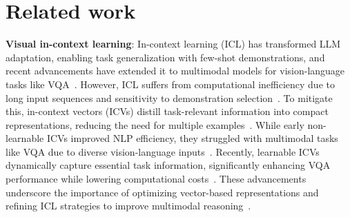\section{Related work}
\noindent\textbf{Visual in-context learning}: In-context learning (ICL) has transformed LLM adaptation, enabling task generalization with few-shot demonstrations, and recent advancements have extended it to multimodal models for vision-language tasks like VQA~\cite{brown2020languagemodelsfewshotlearners, alayrac2022flamingovisuallanguagemodel}. However, ICL suffers from computational inefficiency due to long input sequences and sensitivity to demonstration selection~\cite{peng2024livelearnableincontextvector}. To mitigate this, in-context vectors (ICVs) distill task-relevant information into compact representations, reducing the need for multiple examples~\cite{hendel2023incontextlearningcreatestask, todd2024functionvectorslargelanguage}. While early non-learnable ICVs improved NLP efficiency, they struggled with multimodal tasks like VQA due to diverse vision-language inputs~\cite{li2023configuregoodincontextsequence, yang2024exploringdiverseincontextconfigurations}. Recently, learnable ICVs dynamically capture essential task information, significantly enhancing VQA performance while lowering computational costs~\cite{peng2024livelearnableincontextvector}. These advancements underscore the importance of optimizing vector-based representations and refining ICL strategies to improve multimodal reasoning~\cite{Yin_2024}.\\
